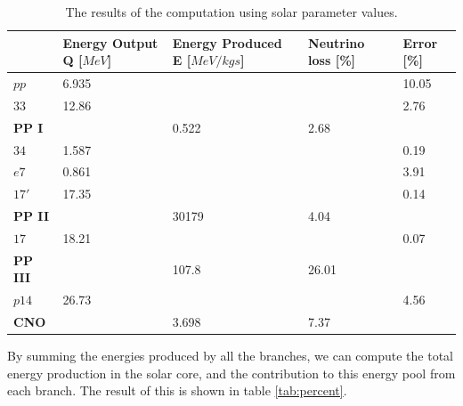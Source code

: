\documentclass[a4paper,10pt,english]{article}
\begin{document}
\begin{table}[]\centering
\begin{tabular}{|l|l|l|l|l|}
\hline
                & Energy Output Q {[}$MeV${]} & Energy Produced E {[}$MeV/kgs${]} & Neutrino loss {[}\%{]} &  Error {[}\%{]} \\ \hline
$pp$            & 6.935                        &                   &                        & 10.05                             \\ \hline
$33$            & 12.86                        &                      &                        & 2.76                             \\ \hline
\textbf{PP I}   &                        & 0.522                  & 2.68                   &                                  \\ \hline
$34$            & 1.587                    &                   &                        & 0.19                             \\ \hline
$e7$            & 0.861                    &                     &                        & 3.91                             \\ \hline
$17'$          & 17.35                     &                  &                        & 0.14                             \\ \hline
\textbf{PP II}  &                         & 30179                  & 4.04                   &                                  \\ \hline
$17$            & 18.21                    &                   &                        & 0.07                             \\ \hline
\textbf{PP III} &                         & 107.8                  & 26.01                  &                                  \\ \hline
$p14$           & 26.73                    &                      &                        & 4.56                             \\ \hline
\textbf{CNO}    &                     & 3.698                     & 7.37                   &                                  \\ \hline
\end{tabular}
\label{tab:results}
\caption{The results of the computation using solar parameter values.}
\end{table}

By summing the energies produced by all the branches, we can compute the total energy production in the solar core, and the contribution to this energy pool from each branch. The result of this is shown in table \ref{tab:percent}.
\end{document}
